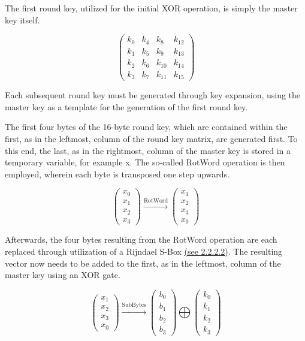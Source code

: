 \documentclass[12pt, a4paper]{report}
\theoremstyle{definition}
\theoremstyle{remark}
\begin{document}
The first round key, utilized for the initial XOR operation, is simply the master key itself.

\[ \left( \begin{array}{cccc}
k_0 & k_4 & k_8 & k_{12} \\
k_1 & k_5 & k_9 & k_{13} \\
k_2 & k_6 & k_{10} & k_{14} \\
k_3 & k_7 & k_{11} & k_{15}\end{array} \right)\] 

Each subsequent round key must be generated through key expansion, using the master key as a template for the generation of the first round key.

The first four bytes of the 16-byte round key, which are contained within the first, as in the leftmost, column of the round key matrix, are generated first. To this end, the last, as in the rightmost, column of the master key is stored in a temporary variable, for example x. The so-called RotWord operation is then employed, wherein each byte is transposed one step upwards.

\[
\left( \begin{array}{c}
x_0 \\
x_1 \\
x_2 \\
x_3\end{array} \right)
\xrightarrow{\text{RotWord}}
\left( \begin{array}{c}
x_1 \\
x_2 \\
x_3 \\
x_0\end{array} \right)
\]

Afterwards, the four bytes resulting from the RotWord operation are each replaced through utilization of a Rijndael S-Box \hyperref[Inverse]{(see 2.2.2.2)}. The resulting vector now needs to be added to the first, as in the leftmost, column of the master key using an XOR gate.

\[
\left( \begin{array}{c}
x_1 \\
x_2 \\
x_3 \\
x_0\end{array} \right)
\xrightarrow{\text{SubBytes}}
\left( \begin{array}{c}
b_0 \\
b_1 \\
b_2 \\
b_3\end{array} \right)
\bigoplus
\left( \begin{array}{c}
k_0 \\
k_1 \\
k_2 \\
k_3\end{array} \right)
\]
\end{document}
